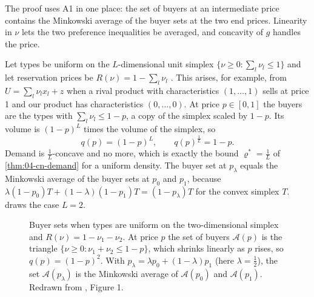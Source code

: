 The proof uses A1 in one place: the set of buyers at an intermediate price contains the Minkowski average of the
buyer sets at the two end prices. Linearity in $\nu$ lets the two preference inequalities be averaged, and concavity
of $g$ handles the price.

\begin{example}\label{ex:04-cn-simplex}
Let types be uniform on the $L$-dimensional unit simplex $\{\nu \ge 0 : \sum_l\nu_l \le 1\}$ and let reservation
prices be $R(\nu) = 1 - \sum_l\nu_l$ \citep[Example 4.1]{CaplinNalebuff1991}. This arises, for example, from
$U = \sum_l \nu_l x_l + z$ when a rival product with characteristics $(1, \dots, 1)$ sells at price 1 and our
product has characteristics $(0, \dots, 0)$. At price $p \in [0,1]$ the buyers are the types with
$\sum_l\nu_l \le 1 - p$, a copy of the simplex scaled by $1 - p$. Its volume is $(1 - p)^L$ times the volume of the
simplex, so
\[
  q(p) = (1 - p)^L, \qquad q(p)^{\frac{1}{L}} = 1 - p.
\]
Demand is $\frac{1}{L}$-concave and no more, which is exactly the bound $\varrho^* = \frac{1}{L}$ of
\cref{thm:04-cn-demand} for a uniform density. The buyer set at $p_\lambda$ equals the Minkowski average of the
buyer sets at $p_0$ and $p_1$, because $\lambda(1 - p_0)T + (1 - \lambda)(1 - p_1)T = (1 - p_\lambda)T$ for the
convex simplex $T$.  draws the case $L = 2$.
\end{example}

\begin{figure}[htbp]
  \centering
  \caption{Buyer sets when types are uniform on the two-dimensional simplex and $R(\nu) = 1 - \nu_1 - \nu_2$.
  At price $p$ the set of buyers $\mathcal{A}(p)$ is the triangle $\{\nu \ge 0 : \nu_1 + \nu_2 \le 1 - p\}$, which
  shrinks linearly as $p$ rises, so $q(p) = (1 - p)^2$. With $p_\lambda = \lambda p_0 + (1 - \lambda)p_1$ (here
  $\lambda = \frac{1}{2}$), the set $\mathcal{A}(p_\lambda)$ is the Minkowski average of $\mathcal{A}(p_0)$ and
  $\mathcal{A}(p_1)$. Redrawn from \citet{CaplinNalebuff1991}, Figure 1.}
  \label{fig:04-cn-simplex}
\end{figure}

